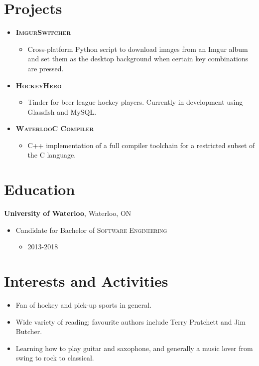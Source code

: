 \documentclass[a4paper,10pt]{article}
\begin{document}
\section{Projects}
\begin{itemize}
	\item {\textsc{\textbf{ImgurSwitcher}}}
	\begin{itemize}
		\item {Cross-platform Python script to download images from an Imgur album and set them as the desktop background when certain key combinations are pressed.}
	\end{itemize}
	
	\item {\textsc{\textbf{HockeyHero}}}
	\begin{itemize}
		\item {Tinder for beer league hockey players. Currently in development using Glassfish and MySQL.}
	\end{itemize}
	
	\item {\textsc{\textbf{WaterlooC Compiler}}}
	\begin{itemize}
		\item {C++ implementation of a full compiler toolchain for a restricted subset of the C language.}
	\end{itemize}	
\end{itemize}

\section{Education}
\textbf{University of Waterloo}, Waterloo, ON
\begin{itemize}
	\item Candidate for Bachelor of \textsc{Software Engineering}
	\begin{itemize}
		\item \textsc{2013-2018}
	\end{itemize}
\end{itemize}

\section{Interests and Activities}
\begin{itemize}
	\item {Fan of hockey and pick-up sports in general.}
	\item {Wide variety of reading; favourite authors include Terry Pratchett and Jim Butcher.}
	\item {Learning how to play guitar and saxophone, and generally a music lover from swing to rock to classical.}
\end{itemize}
\end{document}
